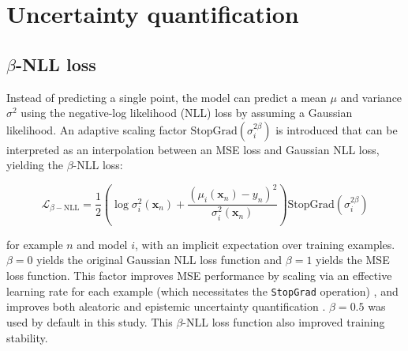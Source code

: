  

\section{Uncertainty quantification}
\label{sec:uncertainty}

\subsection{$\beta$-NLL loss}

Instead of predicting a single point, the model can predict a mean $\mu$ and variance $\sigma^2$ using the negative-log likelihood (NLL) loss \cite{nix_estimating_1994,lakshminarayanan_simple_2017} by assuming a Gaussian likelihood. An adaptive scaling factor $\text{StopGrad}(\sigma_i^{2\beta})$ is introduced that can be interpreted as an interpolation between an MSE loss and Gaussian NLL loss, yielding the $\beta$-NLL loss:

\begin{equation}
	\mathcal{L}_{\beta-\text{NLL}} = \frac{1}{2}\left( \log{\sigma^2_i(\mathbf{x}_n)} +\frac{\left(\mu_i(\mathbf{x}_n) - y_n\right)^2}{\sigma^2_i (\mathbf{x}_n)} \right) \text{StopGrad}\left(\sigma_i^{2\beta}\right)
	\label{eq:loss_beta-NLL}
\end{equation}

for example $n$ and model $i$, with an implicit expectation over training examples. $\beta=0$ yields the original Gaussian NLL loss function and $\beta=1$ yields the MSE loss function. This factor improves MSE performance by scaling via an effective learning rate for each example (which necessitates the \texttt{StopGrad} operation) \cite{seitzer_pitfalls_2022}, and improves both aleatoric and epistemic uncertainty quantification \cite{valdenegro-toro_deeper_2022}. $\beta=0.5$ was used by default in this study. This $\beta$-NLL loss function also improved training stability.

